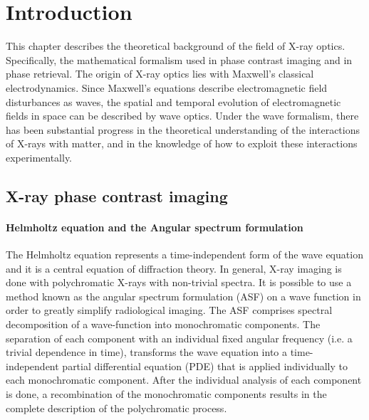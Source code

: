 \documentclass[10pt, a4paper, singlespacing]{report}
\begin{document}
\chapter{Introduction}\label{Introduction}
This chapter describes the theoretical background of the field of X-ray optics. Specifically, the mathematical formalism used in phase contrast imaging and in phase retrieval. The origin of X-ray optics lies with Maxwell's classical electrodynamics\cite{PagsTutes}. Since Maxwell's equations describe electromagnetic field disturbances as waves, the spatial and temporal evolution of electromagnetic ﬁelds in space can be described by wave optics. Under the wave formalism, there has been substantial progress in the theoretical understanding of the interactions of X-rays with matter, and in the knowledge of how to exploit these interactions experimentally.
\section{X-ray phase contrast imaging}\label{PC}

\subsubsection{Helmholtz equation and the Angular spectrum formulation}\label{ASF}
The Helmholtz equation represents a time-independent form of the wave equation and it is a central equation of diffraction theory\cite{CH49}\cite{Pags2006}.
In general, X-ray imaging is done with polychromatic X-rays with non-trivial spectra\cite{CH49}. It is possible to use a method known as the angular spectrum formulation (ASF) on a wave function in order to greatly simplify radiological imaging. The ASF comprises spectral decomposition of a wave-function into monochromatic components. The separation of each component with an individual fixed angular frequency (i.e. a trivial dependence in time), transforms the wave equation into a time-independent partial differential equation (PDE) that is applied individually to each monochromatic component. After the individual analysis of each component is done, a recombination of the monochromatic components results in the complete description of the polychromatic process\cite{CH49}\cite{Pags2006}.
\end{document}
